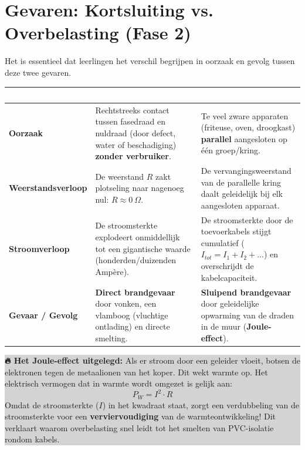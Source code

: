 \documentclass[a4paper, 11pt]{article}
\begin{document}
\newpage

\section{Gevaren: Kortsluiting vs. Overbelasting (Fase 2)}
Het is essentieel dat leerlingen het verschil begrijpen in oorzaak en gevolg tussen deze twee gevaren.

\begin{table}[h]
\centering
\small
\renewcommand{\arraystretch}{1.4}
\begin{tabularx}{\textwidth}{|p{3.5cm}|X|X|}
\hline
\rowcolor{kohagrey}
\textbf{\textcolor{white}{Aspect}} & \textbf{\textcolor{white}{Kortsluiting}} & \textbf{\textcolor{white}{Overbelasting}} \\ \hline
\textbf{Oorzaak} & Rechtstreeks contact tussen fasedraad en nuldraad (door defect, water of beschadiging) \textbf{zonder verbruiker}. & Te veel zware apparaten (friteuse, oven, droogkast) \textbf{parallel} aangesloten op één groep/kring. \\ \hline
\textbf{Weerstandsverloop} & De weerstand $R$ zakt plotseling naar nagenoeg nul: $R \approx 0\ \Omega$. & De vervangingsweerstand van de parallelle kring daalt geleidelijk bij elk aangesloten apparaat. \\ \hline
\textbf{Stroomverloop} & De stroomsterkte explodeert onmiddellijk tot een gigantische waarde (honderden/duizenden Ampère). & De stroomsterkte door de toevoerkabels stijgt cumulatief ($I_{tot} = I_1 + I_2 + ...$) en overschrijdt de kabelcapaciteit. \\ \hline
\textbf{Gevaar / Gevolg} & \textbf{Direct brandgevaar} door vonken, een vlamboog (vluchtige ontlading) en directe smelting. & \textbf{Sluipend brandgevaar} door geleidelijke opwarming van de draden in de muur (\textbf{Joule-effect}). \\ \hline
\end{tabularx}
\end{table}

\noindent\colorbox{lightgrey}{
\begin{minipage}{0.96\textwidth}
    \small \textbf{🔥 Het Joule-effect uitgelegd:} 
    Als er stroom door een geleider vloeit, botsen de elektronen tegen de metaalionen van het koper. Dit wekt warmte op. Het elektrisch vermogen dat in warmte wordt omgezet is gelijk aan:
    \[ P_W = I^2 \cdot R \]
    Omdat de stroomsterkte ($I$) in het kwadraat staat, zorgt een verdubbeling van de stroomsterkte voor een \textbf{verviervoudiging} van de warmteontwikkeling! Dit verklaart waarom overbelasting snel leidt tot het smelten van PVC-isolatie rondom kabels.
\end{minipage}
}
\end{document}
